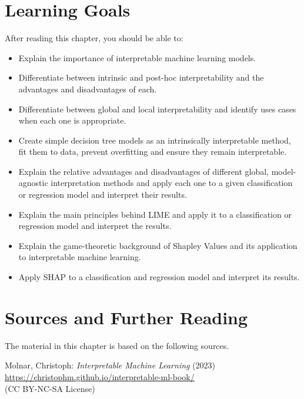 %
%
\section*{Learning Goals}

After reading this chapter, you should be able to:
\begin{itemize}
    \item Explain the importance of interpretable machine learning models.
    \item Differentiate between intrinsic and post-hoc interpretability and the advantages and disadvantages of each.
    \item Differentiate between global and local interpretability and identify uses cases when each one is appropriate.
    \item Create simple decision tree models as an intrinsically interpretable method, fit them to data, prevent overfitting and ensure they remain interpretable.
    \item Explain the relative advantages and disadvantages of different global, model-agnostic interpretation methods and apply each one to a given classification or regression model and interpret their results. 
    \item Explain the main principles behind LIME and apply it to a 	classification or regression model and interpret the results. 
    \item Explain the game-theoretic background of Shapley Values and its application to interpretable machine learning. 
    \item Apply SHAP to a classification and regression model and interpret its results. 
\end{itemize}

\section*{Sources and Further Reading}

The material in this chapter is based on the following sources.

\begin{resourcebox}
Molnar, Christoph: \emph{Interpretable Machine Learning} (2023) \\

\small\url{https://christophm.github.io/interpretable-ml-book/}\normalsize \\

(CC BY-NC-SA License)
\end{resourcebox}

